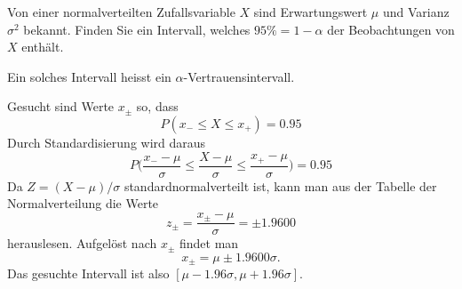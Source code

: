 Von einer normalverteilten Zufallsvariable $X$ sind Erwartungswert $\mu$
und Varianz $\sigma^2$ bekannt. Finden Sie ein Intervall, welches
$95\%=1-\alpha$ der Beobachtungen von $X$ enthält.

Ein solches Intervall heisst ein $\alpha$-Vertrauensintervall.


\begin{loesung}
Gesucht sind Werte $x_\pm$ so, dass 
\[
P(x_-\le X\le x_+)=0.95
\]
Durch Standardisierung wird daraus
\[
P\biggl(\frac{x_--\mu}{\sigma}\le \frac{X-\mu}{\sigma} \le \frac{x_+-\mu}{\sigma}\biggr)
=0.95
\]
Da $Z=(X-\mu)/\sigma$ standardnormalverteilt ist, kann man aus der
Tabelle der Normalverteilung die Werte
\[
z_\pm=\frac{x_\pm -\mu}{\sigma}=\pm1.9600
\]
herauslesen. Aufgelöst nach $x_\pm$ findet man
\[
x_\pm = \mu\pm1.9600\sigma.
\]
Das gesuchte Intervall ist also $[\mu-1.96\sigma,\mu+1.96\sigma]$.
\end{loesung}

